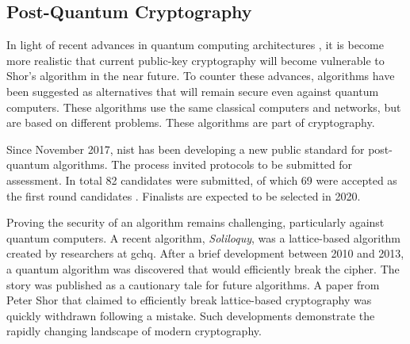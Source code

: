 \subsection{Post-Quantum Cryptography}

In light of recent advances in quantum computing architectures \cite{arute2019quantum}, it is become more realistic that current public-key cryptography will become vulnerable to Shor's algorithm \cite{shor1994} in the near future. To counter these advances,  algorithms have been suggested as alternatives that will remain secure even against quantum computers. These algorithms use the same classical computers and networks, but are based on different problems. These algorithms are part of  cryptography.

Since November 2017, \ac{nist} has been developing a new public standard for post-quantum algorithms. The process invited protocols to be submitted for assessment. In total 82 candidates were submitted, of which 69 were accepted as the first round candidates \cite{alagic2019status}. Finalists are expected to be selected in 2020.

Proving the security of an algorithm remains challenging, particularly against quantum computers. A recent algorithm, \textit{Soliloquy}, was a lattice-based algorithm created by researchers at \ac{gchq}. After a brief development between 2010 and 2013, a quantum algorithm was discovered that would efficiently break the cipher. The story was published as a cautionary tale for future algorithms. A paper from Peter Shor that claimed to efficiently break lattice-based cryptography was quickly withdrawn following a mistake\cite{eldar2016efficient}. Such developments demonstrate the rapidly changing landscape of modern cryptography.



